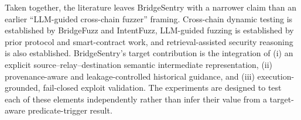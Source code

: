Taken together, the literature leaves BridgeSentry with a narrower claim than an earlier ``LLM-guided cross-chain fuzzer'' framing. Cross-chain dynamic testing is established by BridgeFuzz and IntentFuzz, LLM-guided fuzzing is established by prior protocol and smart-contract work, and retrieval-assisted security reasoning is also established. BridgeSentry's target contribution is the integration of (i) an explicit source--relay--destination semantic intermediate representation, (ii) provenance-aware and leakage-controlled historical guidance, and (iii) execution-grounded, fail-closed exploit validation. The experiments are designed to test each of these elements independently rather than infer their value from a target-aware predicate-trigger result.
